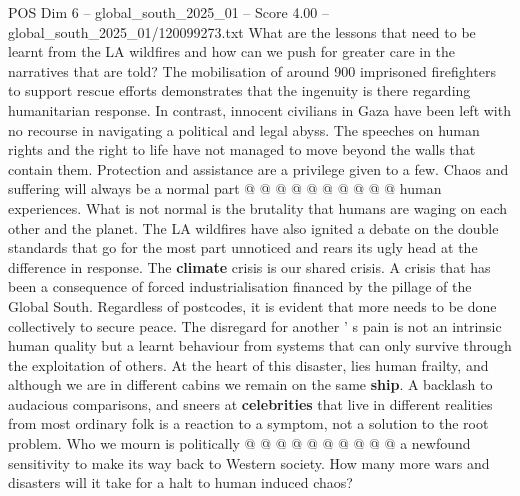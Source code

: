 \begin{textsample}{POS Dim 6 – global\_south\_2025\_01 – Score 4.00 – global\_south\_2025\_01/120099273.txt}
What are the lessons that need to be learnt from the LA wildfires and how can we push for greater care in the narratives that are told?
The mobilisation of around 900 imprisoned firefighters to support rescue efforts demonstrates that the ingenuity is there regarding humanitarian response.
In contrast, innocent civilians in Gaza have been left with no recourse in navigating a political and legal abyss.
The speeches on human rights and the right to life have not managed to move beyond the walls that contain them.
Protection and assistance are a privilege given to a few.
Chaos and suffering will always be a normal part @ @ @ @ @ @ @ @ @ @ human experiences.
What is not normal is the brutality that humans are waging on each other and the planet.
The LA wildfires have also ignited a debate on the double standards that go for the most part unnoticed and rears its ugly head at the difference in response.
The \textbf{climate} crisis is our shared crisis.
A crisis that has been a consequence of forced industrialisation financed by the pillage of the Global South.
Regardless of postcodes, it is evident that more needs to be done collectively to secure peace.
The disregard for another ' s pain is not an intrinsic human quality but a learnt behaviour from systems that can only survive through the exploitation of others.
At the heart of this disaster, lies human frailty, and although we are in different cabins we remain on the same \textbf{ship}.
A backlash to audacious comparisons, and sneers at \textbf{celebrities} that live in different realities from most ordinary folk is a reaction to a symptom, not a solution to the root problem.
Who we mourn is politically @ @ @ @ @ @ @ @ @ @ a newfound sensitivity to make its way back to Western society.
How many more wars and disasters will it take for a halt to human induced chaos?

\end{textsample}

